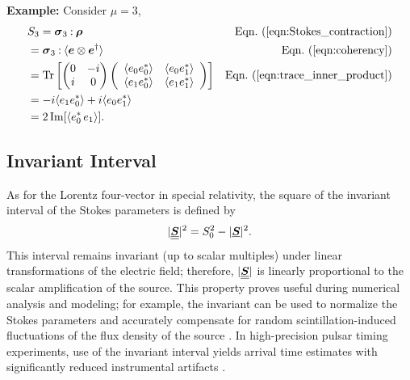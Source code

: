 \begin{tcolorbox}
{\bf Example:} Consider $\mu = 3$,
\begin{align*}
& S_3  = \pauli{3} \dcbo \cohM{\rho} & \peqn{Stokes_contraction} \\
%
& = \pauli{3} \dcbo \langle\Jcol{e} \otimes \Jcol{e}^\dagger \rangle & \peqn{coherency} \\
%
&= \tr{\pauliV \left( 
    \begin{array}{cc}
    \langle e_0 e_0^* \rangle & \langle e_0 e_1^* \rangle \\
     \langle e_1 e_0^* \rangle & \langle e_1 e_1^* \rangle
    \end{array}
\right)} & \peqn{trace_inner_product} \\
%
&= -\Ci \langle e_1 e_0^* \rangle + \Ci \langle e_0 e_1^* \rangle \\
    &= 2\, \imag[\langle e_0^*\, e_1 \rangle].
%
\end{align*}
\end{tcolorbox}

%
%

\subsection{Invariant Interval}
\label{sec:invariant_interval}

As for the Lorentz four-vector in special relativity, the square of the invariant interval of the Stokes parameters is defined by \citep{bar63,bri00}
%
\begin{equation}
|\underline{\underline{\mbox{\boldmath $S$}}}|^2 = S_0^2 -|\underline{\mbox{\boldmath $S$}}|^2.
\label{eqn:invariant_interval}
\end{equation}
%
This interval remains invariant (up to scalar multiples) under linear transformations of the electric field; therefore, $|\underline{\underline{\mbox{\boldmath $S$}}}|$ is linearly proportional to the scalar amplification of the source.
%
This property proves useful during numerical analysis and modeling; for example, the invariant can be used to normalize the Stokes parameters and accurately compensate for random scintillation-induced fluctuations of the flux density of the source \citep[as in][]{van04c}.
%
In high-precision pulsar timing experiments, use of the invariant interval yields arrival time estimates with significantly reduced instrumental artifacts  \citep[e.g.,][]{vbb+01}.

